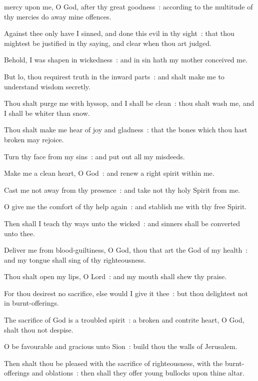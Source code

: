  mercy upon me, O God, after thy great goodness~: according to the multitude of thy mercies do away mine offences.\par
{}
Against thee only have I sinned, and done this evil in thy sight~: that thou mightest be justified in thy saying, and clear when thou art judged.\par
{}Behold, I was shapen in wickedness~: and in sin hath my mother conceived me.\par
{}But lo, thou requirest truth in the inward parts~: and shalt make me to understand wisdom secretly.\par
{}Thou shalt purge me with hyssop, and I shall be clean~: thou shalt wash me, and I shall be whiter than snow.\par
{}Thou shalt make me hear of joy and gladness~: that the bones which thou hast broken may rejoice.\par
{}Turn thy face from my sins~: and put out all my misdeeds.\par
{}Make me a clean heart, O God~: and renew a right spirit within me.\par
{}Cast me not away from thy presence~: and take not thy holy Spirit from me.\par
{}O give me the comfort of thy help again~: and stablish me with thy free Spirit.\par
{}Then shall I teach thy ways unto the wicked~: and sinners shall be converted unto thee.\par
{}Deliver me from blood-guiltiness, O God, thou that art the God of my health~: and my tongue shall sing of thy righteousness.\par
{}Thou shalt open my lips, O Lord~: and my mouth shall shew thy praise.\par
{}For thou desirest no sacrifice, else would I give it thee~: but thou delightest not in burnt-offerings.\par
{}The sacrifice of God is a troubled spirit~: a broken and contrite heart, O God, shalt thou not despise.\par
{}O be favourable and gracious unto Sion~: build thou the walls of Jerusalem.\par
{}Then shalt thou be pleased with the sacrifice of righteousness, with the burnt-offerings and oblations~: then shall they offer young bullocks upon thine altar.\par

